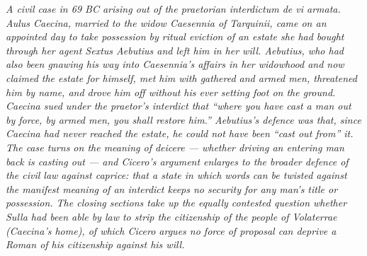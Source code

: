 
\textit{A civil case in 69 BC arising out of the praetorian
\textit{interdictum de vi armata}. Aulus Caecina, married to the
widow Caesennia of Tarquinii, came on an appointed day to take
possession by ritual eviction of an estate she had bought through
her agent Sextus Aebutius and left him in her will. Aebutius,
who had also been gnawing his way into Caesennia's affairs in her
widowhood and now claimed the estate for himself, met him with
gathered and armed men, threatened him by name, and drove him off
without his ever setting foot on the ground. Caecina sued under
the praetor's interdict that ``where you have cast a man out by
force, by armed men, you shall restore him.'' Aebutius's defence
was that, since Caecina had never reached the estate, he could
not have been ``cast out from'' it. The case turns on the meaning
of \textit{deicere} --- whether driving an entering man back is
casting out --- and Cicero's argument enlarges to the broader
defence of the civil law against caprice: that a state in which
words can be twisted against the manifest meaning of an interdict
keeps no security for any man's title or possession. The closing
sections take up the equally contested question whether Sulla had
been able by law to strip the citizenship of the people of
Volaterrae (Caecina's home), of which Cicero argues no force of
proposal can deprive a Roman of his citizenship against his will.}
